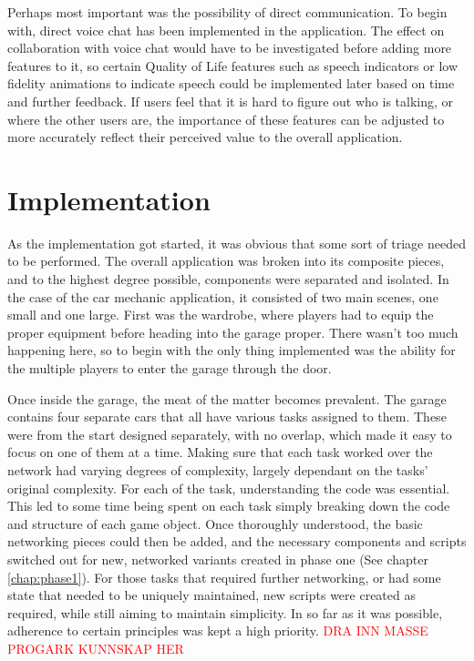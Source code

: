 Perhaps most important was the possibility of direct communication. To begin with, direct voice chat has been implemented in the application. The effect on collaboration with voice chat would have to be investigated before adding more features to it, so certain Quality of Life features such as speech indicators or low fidelity animations to indicate speech could be implemented later based on time and further feedback. If users feel that it is hard to figure out who is talking, or where the other users are, the importance of these features can be adjusted to more accurately reflect their perceived value to the overall application.


\section{Implementation}
As the implementation got started, it was obvious that some sort of triage needed to be performed. The overall application was broken into its composite pieces, and to the highest degree possible, components were separated and isolated. In the case of the car mechanic application, it consisted of two main scenes, one small and one large. First was the wardrobe, where players had to equip the proper equipment before heading into the garage proper. There wasn't too much happening here, so to begin with the only thing implemented was the ability for the multiple players to enter the garage through the door.

Once inside the garage, the meat of the matter becomes prevalent. The garage contains four separate cars that all have various tasks assigned to them. These were from the start designed separately, with no overlap, which made it easy to focus on one of them at a time. Making sure that each task worked over the network had varying degrees of complexity, largely dependant on the tasks' original complexity. For each of the task, understanding the code was essential. This led to some time being spent on each task simply breaking down the code and structure of each game object. Once thoroughly understood, the basic networking pieces could then be added, and the necessary components and scripts switched out for new, networked variants created in phase one (See chapter \ref{chap:phase1}). For those tasks that required further networking, or had some state that needed to be uniquely maintained, new scripts were created as required, while still aiming to maintain simplicity.  In so far as it was possible, adherence to certain principles was kept a high priority. \textcolor{red}{DRA INN MASSE PROGARK KUNNSKAP HER}


